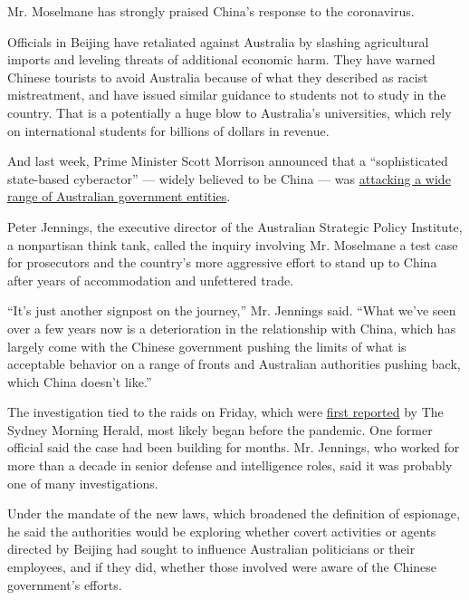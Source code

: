 Mr. Moselmane has strongly praised China's response to the coronavirus.

Officials in Beijing have retaliated against Australia by slashing
agricultural imports and leveling threats of additional economic harm.
They have warned Chinese tourists to avoid Australia because of what
they described as racist mistreatment, and have issued similar guidance
to students not to study in the country. That is a potentially a huge
blow to Australia's universities, which rely on international students
for billions of dollars in revenue.

And last week, Prime Minister Scott Morrison announced that a
``sophisticated state-based cyberactor'' --- widely believed to be China
--- was
\href{https://www.abc.net.au/news/2020-06-19/cyber-attacks-likely-huawei-5g-ban-payback-from-china-spy-agency/12374374}{attacking
a wide range of Australian government entities}.

Peter Jennings, the executive director of the Australian Strategic
Policy Institute, a nonpartisan think tank, called the inquiry involving
Mr. Moselmane a test case for prosecutors and the country's more
aggressive effort to stand up to China after years of accommodation and
unfettered trade.

``It's just another signpost on the journey,'' Mr. Jennings said. ``What
we've seen over a few years now is a deterioration in the relationship
with China, which has largely come with the Chinese government pushing
the limits of what is acceptable behavior on a range of fronts and
Australian authorities pushing back, which China doesn't like.''

The investigation tied to the raids on Friday, which were
\href{https://www.smh.com.au/politics/nsw/nsw-labor-mp-shaoquett-moselmane-to-be-suspended-after-raids-probing-china-links-20200626-p556gd.html}{first
reported} by The Sydney Morning Herald, most likely began before the
pandemic. One former official said the case had been building for
months. Mr. Jennings, who worked for more than a decade in senior
defense and intelligence roles, said it was probably one of many
investigations.

Under the mandate of the new laws, which broadened the definition of
espionage, he said the authorities would be exploring whether covert
activities or agents directed by Beijing had sought to influence
Australian politicians or their employees, and if they did, whether
those involved were aware of the Chinese government's efforts.

